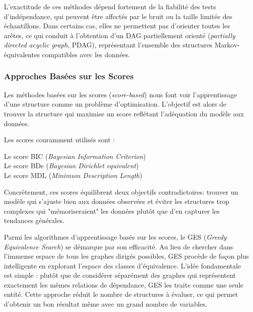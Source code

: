 \documentclass{article}
\begin{document}
L'exactitude de ces méthodes dépend fortement de la fiabilité des tests d'indépendance, qui peuvent être affectés par le
bruit ou la taille limitée des échantillons. Dans certains cas, elles ne permettent pas d'orienter toutes les arêtes,
ce qui conduit à l'obtention d'un DAG partiellement orienté (\textit{partially directed acyclic graph}, PDAG), représentant
l'ensemble des structures Markov-équivalentes compatibles avec les données.

\subsubsection{Approches Basées sur les Scores}

Les méthodes basées sur les scores (\textit{score-based}) nous font voir l'apprentissage d'une structure comme un problème
d'optimisation. L'objectif est alors de trouver la structure qui maximise un score reflétant l'adéquation du modèle aux données.

Les scores couramment utilisés sont :

Le score BIC (\textit{Bayesian Information Criterion})\\
Le score BDe (\textit{Bayesian Dirichlet equivalent})\\
Le score MDL (\textit{Minimum Description Length})

Concrètement, ces scores équilibrent deux objectifs contradictoires: trouver un modèle qui s'ajuste bien aux données observées
et éviter les structures trop complexes qui "mémoriseraient" les données plutôt que d'en capturer les tendances générales.

Parmi les algorithmes d'apprentissage basés sur les scores, le GES (\textit{Greedy Equivalence Search}) se démarque par son
efficacité. Au lieu de chercher dans l'immense espace de tous les graphes dirigés possibles, GES procède de façon plus
intelligente en explorant l'espace des classes d'équivalence. L'idée fondamentale est simple : plutôt que de considérer
séparément des graphes qui représentent exactement les mêmes relations de dépendance, GES les traite
comme une seule entité. Cette approche réduit le nombre de structures à évaluer, ce qui permet d'obtenir un bon résultat
même avec un grand nombre de variables.



\end{document}
